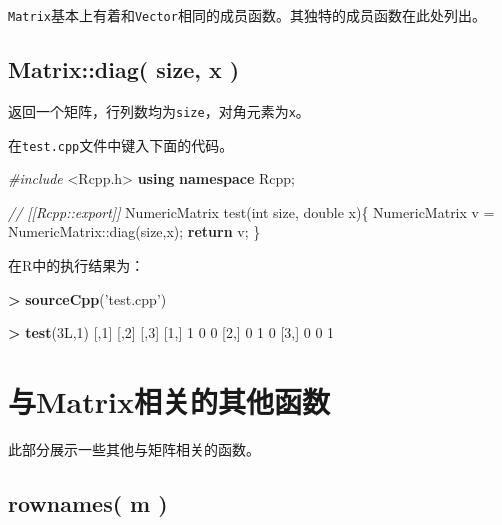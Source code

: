 \documentclass[]{ctexbook}
\newenvironment{Shaded}{\begin{snugshade}}{\end{snugshade}}
\newcommand{\KeywordTok}[1]{\textcolor[rgb]{0.13,0.29,0.53}{\textbf{#1}}}
\newcommand{\DataTypeTok}[1]{\textcolor[rgb]{0.13,0.29,0.53}{#1}}
\newcommand{\DecValTok}[1]{\textcolor[rgb]{0.00,0.00,0.81}{#1}}
\newcommand{\StringTok}[1]{\textcolor[rgb]{0.31,0.60,0.02}{#1}}
\newcommand{\ImportTok}[1]{#1}
\newcommand{\CommentTok}[1]{\textcolor[rgb]{0.56,0.35,0.01}{\textit{#1}}}
\newcommand{\ControlFlowTok}[1]{\textcolor[rgb]{0.13,0.29,0.53}{\textbf{#1}}}
\newcommand{\OperatorTok}[1]{\textcolor[rgb]{0.81,0.36,0.00}{\textbf{#1}}}
\newcommand{\PreprocessorTok}[1]{\textcolor[rgb]{0.56,0.35,0.01}{\textit{#1}}}
\newcommand{\NormalTok}[1]{#1}
\begin{document}
\texttt{Matrix}基本上有着和\texttt{Vector}相同的成员函数。其独特的成员函数在此处列出。

\subsection{Matrix::diag( size, x )}\label{Mdiag}

返回一个矩阵，行列数均为\texttt{size}，对角元素为\texttt{x}。

在\texttt{test.cpp}文件中键入下面的代码。

\begin{Shaded}
\begin{Highlighting}[]
\PreprocessorTok{#include }\ImportTok{<Rcpp.h>}
\KeywordTok{using} \KeywordTok{namespace}\NormalTok{ Rcpp;}

\CommentTok{// [[Rcpp::export]]}
\NormalTok{NumericMatrix test(}\DataTypeTok{int}\NormalTok{ size, }\DataTypeTok{double}\NormalTok{ x)\{}
\NormalTok{  NumericMatrix v = NumericMatrix::diag(size,x);}
  \ControlFlowTok{return}\NormalTok{ v;}
\NormalTok{\}}
\end{Highlighting}
\end{Shaded}

在R中的执行结果为：

\begin{Shaded}
\begin{Highlighting}[]
\OperatorTok{>}\StringTok{ }\KeywordTok{sourceCpp}\NormalTok{(}\StringTok{'test.cpp'}\NormalTok{)}

\OperatorTok{>}\StringTok{ }\KeywordTok{test}\NormalTok{(3L,}\DecValTok{1}\NormalTok{)}
\NormalTok{     [,}\DecValTok{1}\NormalTok{] [,}\DecValTok{2}\NormalTok{] [,}\DecValTok{3}\NormalTok{]}
\NormalTok{[}\DecValTok{1}\NormalTok{,]    }\DecValTok{1}    \DecValTok{0}    \DecValTok{0}
\NormalTok{[}\DecValTok{2}\NormalTok{,]    }\DecValTok{0}    \DecValTok{1}    \DecValTok{0}
\NormalTok{[}\DecValTok{3}\NormalTok{,]    }\DecValTok{0}    \DecValTok{0}    \DecValTok{1}
\end{Highlighting}
\end{Shaded}

\section{与Matrix相关的其他函数}\label{other-functions}

此部分展示一些其他与矩阵相关的函数。

\subsection{rownames( m )}\label{rownamesMatrix}
\end{document}
